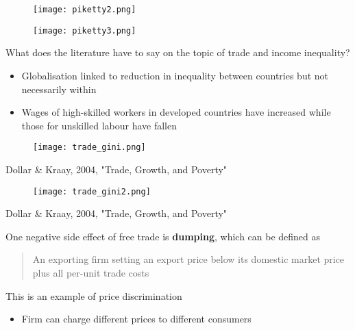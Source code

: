 \documentclass{beamer}
\begin{document}
\begin{frame}
  \begin{figure}
    \texttt{[image: piketty2.png]}
  \end{figure}
\end{frame}

\begin{frame}
  \begin{figure}
    \texttt{[image: piketty3.png]}
  \end{figure}
\end{frame}

\begin{frame}
  What does the literature have to say on the topic of trade and income inequality? 
 \begin{itemize}
    \item Globalisation linked to reduction in inequality between countries but not necessarily within 
    \item Wages of high-skilled workers in developed countries have increased while those for unskilled labour have fallen
  \end{itemize}
\end{frame}

\begin{frame}
  \begin{figure}
    \texttt{[image: trade\_gini.png]}
  \end{figure}
  Dollar \& Kraay, 2004, "Trade, Growth, and Poverty"
\end{frame}

\begin{frame}
  \begin{figure}
    \texttt{[image: trade\_gini2.png]}
  \end{figure}
  Dollar \& Kraay, 2004, "Trade, Growth, and Poverty"
\end{frame}

\begin{frame}
  One negative side effect of free trade is \textbf{dumping}, which can be defined as
  \begin{quote}
    An exporting firm setting an export price below its domestic market price plus all per-unit trade costs
  \end{quote}
  \medskip
  This is an example of price discrimination 
  \begin{itemize}
    \item Firm can charge different prices to different consumers
  \end{itemize}  
\end{frame}
\end{document}
